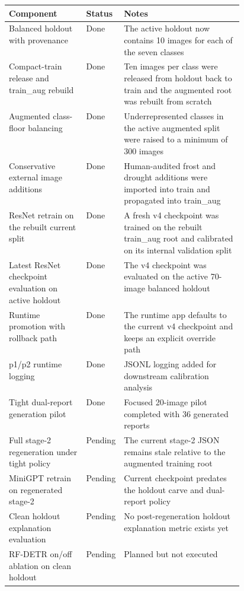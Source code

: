 \begin{tabularx}{\linewidth}{>{\raggedright\arraybackslash}p{0.33\linewidth} >{\raggedright\arraybackslash}p{0.13\linewidth} X}
\toprule
Component & Status & Notes \\
\midrule
Balanced holdout with provenance & Done & The active holdout now contains 10 images for each of the seven classes \\
Compact-train release and train\_aug rebuild & Done & Ten images per class were released from holdout back to train and the augmented root was rebuilt from scratch \\
Augmented class-floor balancing & Done & Underrepresented classes in the active augmented split were raised to a minimum of 300 images \\
Conservative external image additions & Done & Human-audited frost and drought additions were imported into train and propagated into train\_aug \\
ResNet retrain on the rebuilt current split & Done & A fresh v4 checkpoint was trained on the rebuilt train\_aug root and calibrated on its internal validation split \\
Latest ResNet checkpoint evaluation on active holdout & Done & The v4 checkpoint was evaluated on the active 70-image balanced holdout \\
Runtime promotion with rollback path & Done & The runtime app defaults to the current v4 checkpoint and keeps an explicit override path \\
p1/p2 runtime logging & Done & JSONL logging added for downstream calibration analysis \\
Tight dual-report generation pilot & Done & Focused 20-image pilot completed with 36 generated reports \\
Full stage-2 regeneration under tight policy & Pending & The current stage-2 JSON remains stale relative to the augmented training root \\
MiniGPT retrain on regenerated stage-2 & Pending & Current checkpoint predates the holdout carve and dual-report policy \\
Clean holdout explanation evaluation & Pending & No post-regeneration holdout explanation metric exists yet \\
RF-DETR on/off ablation on clean holdout & Pending & Planned but not executed \\
\bottomrule
\end{tabularx}
